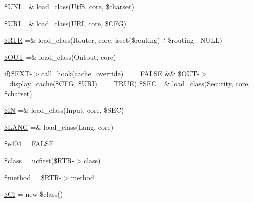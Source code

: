 \begin{DoxyCompactItemize}
\mbox{\hyperlink{_code_igniter_8php_a2060dabd8d00b5b0539bd041bf450924}{\$\+U\+NI}} =\& load\+\_\+class(\textquotesingle{}Utf8\textquotesingle{}, \textquotesingle{}core\textquotesingle{}, \$charset)
\item 
\mbox{\hyperlink{_code_igniter_8php_a630d83d898b39ad4568906284f7f5336}{\$\+U\+RI}} =\& load\+\_\+class(\textquotesingle{}U\+RI\textquotesingle{}, \textquotesingle{}core\textquotesingle{}, \$C\+FG)
\item 
\mbox{\hyperlink{_code_igniter_8php_a4d6c9285c8483e4708a57a4128fc95f3}{\$\+R\+TR}} =\& load\+\_\+class(\textquotesingle{}Router\textquotesingle{}, \textquotesingle{}core\textquotesingle{}, isset(\$routing) ? \$routing \+: N\+U\+LL)
\item 
\mbox{\hyperlink{_code_igniter_8php_ad437402616c81c82c746f09854b23729}{\$\+O\+UT}} =\& load\+\_\+class(\textquotesingle{}Output\textquotesingle{}, \textquotesingle{}core\textquotesingle{})
\item 
\mbox{\hyperlink{_code_igniter_8php_a565ae1002e1468af84434f86276c519e}{if}}(\$E\+XT-\/$>$call\+\_\+hook(\textquotesingle{}cache\+\_\+override\textquotesingle{})===F\+A\+L\+SE \&\& \$O\+UT-\/$>$\+\_\+display\+\_\+cache(\$C\+FG, \$U\+RI)===T\+R\+UE) \mbox{\hyperlink{_code_igniter_8php_a4b7abe119386c359d42b2eddeb8383b8}{\$\+S\+EC}} =\& load\+\_\+class(\textquotesingle{}Security\textquotesingle{}, \textquotesingle{}core\textquotesingle{}, \$charset)
\item 
\mbox{\hyperlink{_code_igniter_8php_a66d076d48aff75a01bb726f5bdd94d46}{\$\+IN}} =\& load\+\_\+class(\textquotesingle{}Input\textquotesingle{}, \textquotesingle{}core\textquotesingle{}, \$S\+EC)
\item 
\mbox{\hyperlink{_code_igniter_8php_afab4eb732acc05cebf41e0afce18681c}{\$\+L\+A\+NG}} =\& load\+\_\+class(\textquotesingle{}Lang\textquotesingle{}, \textquotesingle{}core\textquotesingle{})
\item 
\mbox{\hyperlink{_code_igniter_8php_a20b89fa011927fc498a4a665fa44d061}{\$e404}} = F\+A\+L\+SE
\item 
\mbox{\hyperlink{_code_igniter_8php_a252ba022809910ea710a068fc1bab657}{\$class}} = ucfirst(\$R\+TR-\/$>$class)
\item 
\mbox{\hyperlink{_code_igniter_8php_a12661b2fc0f57f97e30a1620889ce9c6}{\$method}} = \$R\+TR-\/$>$method
\item 
\mbox{\hyperlink{_code_igniter_8php_ae0314d046ddf7fcfaec03222977427d3}{\$\+CI}} = new \$class()
\end{DoxyCompactItemize}


